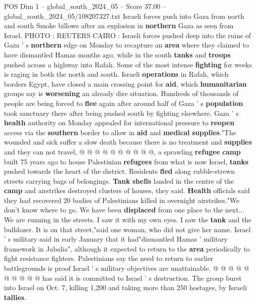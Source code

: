 \begin{textsample}{POS Dim 1 – global\_south\_2024\_05 – Score 37.00 – global\_south\_2024\_05/108207327.txt}  \label{ex:f1_pos_073}
Israeli forces push into Gaza from north and south Smoke billows after an explosion in \textbf{northern} Gaza as seen from Israel.
PHOTO : REUTERS CAIRO : Israeli forces pushed deep into the ruins of Gaza ' s \textbf{northern} edge on Monday to recapture an \textbf{area} where they claimed to have dismantled Hamas months ago, while in the south \textbf{tanks} and \textbf{troops} pushed across a highway into Rafah.
Some of the most intense \textbf{fighting} for weeks is raging in both the north and south.
Israeli \textbf{operations} in Rafah, which borders Egypt, have closed a main crossing point for \textbf{aid}, which \textbf{humanitarian} groups say is \textbf{worsening} an already dire situation.
Hundreds of thousands of people are being forced to \textbf{flee} again after around half of Gaza ' s \textbf{population} took sanctuary there after being pushed south by fighting elsewhere.
Gaza ' s \textbf{health} authority on Monday appealed for international pressure to \textbf{reopen} access via the \textbf{southern} border to allow in \textbf{aid} and \textbf{medical} \textbf{supplies}."The wounded and sick suffer a slow death because there is no treatment and \textbf{supplies} and they can not travel, @ @ @ @ @ @ @ @ @ @, a sprawling \textbf{refugee} \textbf{camp} built 75 years ago to house Palestinian \textbf{refugees} from what is now Israel, \textbf{tanks} pushed towards the heart of the district.
Residents \textbf{fled} along rubble-strewn streets carrying bags of belongings. \textbf{Tank} \textbf{shells} landed in the centre of the \textbf{camp} and airstrikes destroyed clusters of houses, they said. \textbf{Health} officials said they had recovered 20 bodies of Palestinians killed in overnight airstrikes."We don't know where to go.
We have been \textbf{displaced} from one place to the next...
We are running in the streets.
I saw it with my own eyes.
I saw the \textbf{tank} and the bulldozer.
It is on that street,"said one woman, who did not give her name.
Israel ' s military said in early January that it had"dismantled Hamas ' military framework in Jabalia", although it expected to return to the \textbf{area} periodically to fight resistance fighters.
Palestinians say the need to return to earlier battlegrounds is proof Israel ' s military objectives are unattainable. @ @ @ @ @ @ @ @ @ @ has said it is committed to Israel ' s destruction.
The group burst into Israel on Oct. 7, killing 1,200 and taking more than 250 hostages, by Israeli \textbf{tallies}.

\end{textsample}
